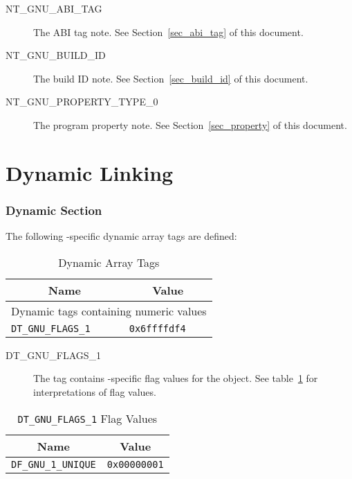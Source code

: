 \begin{description}
 \item[NT_GNU_ABI_TAG]
   The ABI tag note.  See Section~\ref{sec_abi_tag} of this document.
 \item[NT_GNU_BUILD_ID]
   The build ID note.  See Section~\ref{sec_build_id} of this document.
 \item[NT_GNU_PROPERTY_TYPE_0]
   The program property note.  See Section~\ref{sec_property} of this
   document.
\end{description}

\section{Dynamic Linking}

\subsubsection{Dynamic Section}

The following \xOS-specific dynamic array tags are defined:

\begin{table}[H]
\Hrule
  \caption{Dynamic Array Tags}
  \begin{center}
    \begin{tabular}[t]{l|l}
      \multicolumn{1}{c}{Name}    & \multicolumn{1}{c}{Value} \\
      \hline
      \multicolumn{2}{c}{Dynamic tags containing numeric values} \\
      \texttt{DT_GNU_FLAGS_1}     & \texttt{0x6ffffdf4} \\
      \hline
    \end{tabular}
  \end{center}
\Hrule
\end{table}

\begin{description}
 \item[DT_GNU_FLAGS_1]
      The tag contains \xOS-specific flag values for the object.  See
      table~\ref{dt_gnu_flags_1} for interpretations of flag values.
\end{description}

\begin{table}[H]
\Hrule
  \caption{\texttt{DT_GNU_FLAGS_1} Flag Values}
  \label{dt_gnu_flags_1}
  \begin{center}
    \begin{tabular}[t]{l|l}
      \multicolumn{1}{c}{Name} & \multicolumn{1}{c}{Value} \\
      \hline
      \texttt{DF_GNU_1_UNIQUE} & \texttt{0x00000001} \\
    \end{tabular}
  \end{center}
\Hrule
\end{table}

